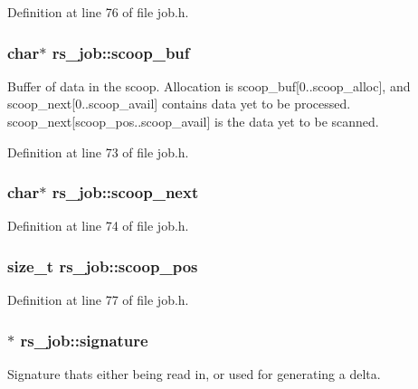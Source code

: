Definition at line 76 of file job.\+h.

\hypertarget{structrs__job_a202ce198ebac8c9f4410c19b6eaf954d}{}
\subsubsection[{scoop\+\_\+buf}]{\setlength{\rightskip}{0pt plus 5cm}char$\ast$ rs\+\_\+job\+::scoop\+\_\+buf}\label{structrs__job_a202ce198ebac8c9f4410c19b6eaf954d}
Buffer of data in the scoop. Allocation is scoop\+\_\+buf\mbox{[}0..scoop\+\_\+alloc\mbox{]}, and scoop\+\_\+next\mbox{[}0..scoop\+\_\+avail\mbox{]} contains data yet to be processed. scoop\+\_\+next\mbox{[}scoop\+\_\+pos..scoop\+\_\+avail\mbox{]} is the data yet to be scanned. 

Definition at line 73 of file job.\+h.

\hypertarget{structrs__job_a129ace01cf9aaad6dce002b23fd06bbb}{}
\subsubsection[{scoop\+\_\+next}]{\setlength{\rightskip}{0pt plus 5cm}char$\ast$ rs\+\_\+job\+::scoop\+\_\+next}\label{structrs__job_a129ace01cf9aaad6dce002b23fd06bbb}


Definition at line 74 of file job.\+h.

\hypertarget{structrs__job_a8a15c3770c99570c3fbf603f58e8b9b8}{}
\subsubsection[{scoop\+\_\+pos}]{\setlength{\rightskip}{0pt plus 5cm}size\+\_\+t rs\+\_\+job\+::scoop\+\_\+pos}\label{structrs__job_a8a15c3770c99570c3fbf603f58e8b9b8}


Definition at line 77 of file job.\+h.

\hypertarget{structrs__job_ac8b7a197f196b0eabdd1dd2de0f7852f}{}
\subsubsection[{signature}]{$\ast$ rs\+\_\+job\+::signature}\label{structrs__job_ac8b7a197f196b0eabdd1dd2de0f7852f}
Signature that\textquotesingle{}s either being read in, or used for generating a delta. 

